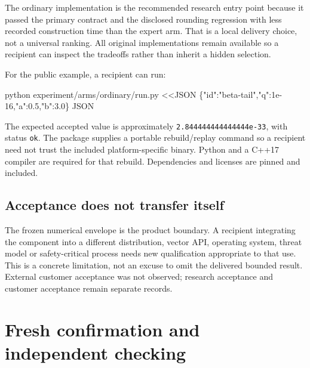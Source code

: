 \documentclass[
  10pt,
]{article}
\newenvironment{Shaded}{}{}
\newcommand{\ExtensionTok}[1]{#1}
\newcommand{\NormalTok}[1]{#1}
\newcommand{\OperatorTok}[1]{\textcolor[rgb]{0.40,0.40,0.40}{#1}}
\newcommand{\StringTok}[1]{\textcolor[rgb]{0.25,0.44,0.63}{#1}}
\newcommand{\editionbreak}{\par\bigskip\Needspace{8\baselineskip}}
\begin{document}
The ordinary implementation is the recommended research entry point
because it passed the primary contract and the disclosed rounding
regression with less recorded construction time than the expert arm.
That is a local delivery choice, not a universal ranking. All original
implementations remain available so a recipient can inspect the
tradeoffs rather than inherit a hidden selection.

For the public example, a recipient can run:

\begin{Shaded}
\begin{Highlighting}[]
\ExtensionTok{python}\NormalTok{ experiment/arms/ordinary/run.py }\OperatorTok{\textless{}\textless{}\textquotesingle{}JSON\textquotesingle{}}
\StringTok{\{"id":"beta{-}tail","q":1e{-}16,"a":0.5,"b":3.0\}}
\OperatorTok{JSON}
\end{Highlighting}
\end{Shaded}

The expected accepted value is approximately
\texttt{2.844444444444444e-33}, with status \texttt{ok}. The package
supplies a portable rebuild/replay command so a recipient need not trust
the included platform-specific binary. Python and a C++17 compiler are
required for that rebuild. Dependencies and licenses are pinned and
included.

\hypertarget{acceptance-does-not-transfer-itself}{%
\subsection{Acceptance does not transfer
itself}\label{acceptance-does-not-transfer-itself}}

The frozen numerical envelope is the product boundary. A recipient
integrating the component into a different distribution, vector API,
operating system, threat model or safety-critical process needs new
qualification appropriate to that use. This is a concrete limitation,
not an excuse to omit the delivered bounded result. External customer
acceptance was not observed; research acceptance and customer acceptance
remain separate records.

\editionbreak

\hypertarget{fresh-confirmation-and-independent-checking}{%
\section{Fresh confirmation and independent
checking}\label{fresh-confirmation-and-independent-checking}}
\end{document}
